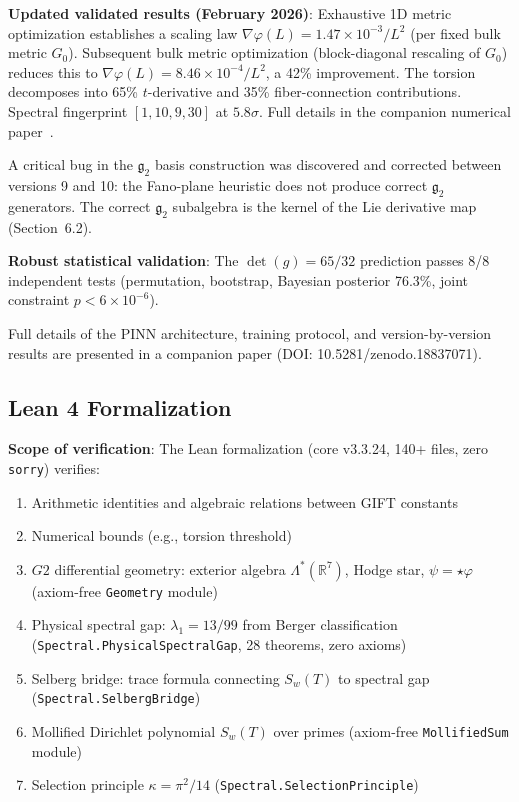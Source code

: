 \documentclass[11pt,a4paper]{article}
\newcommand{\Gtwo}{\mathrm{G}_2}
\def\Gtwo{G2}%
\begin{document}
\textbf{Updated validated results (February 2026)}: Exhaustive 1D metric optimization establishes a scaling law $\nabla\varphi(L) = 1.47 \times 10^{-3}/L^2$ (per fixed bulk metric $G_0$). Subsequent bulk metric optimization (block-diagonal rescaling of $G_0$) reduces this to $\nabla\varphi(L) = 8.46 \times 10^{-4}/L^2$, a 42\% improvement. The torsion decomposes into 65\% $t$-derivative and 35\% fiber-connection contributions. Spectral fingerprint $[1, 10, 9, 30]$ at $5.8\sigma$. Full details in the companion numerical paper~\cite{numerical2026}.

A critical bug in the $\mathfrak{g}_2$ basis construction was discovered and corrected between versions 9 and 10: the Fano-plane heuristic does not produce correct $\mathfrak{g}_2$ generators. The correct $\mathfrak{g}_2$ subalgebra is the kernel of the Lie derivative map (Section~6.2).

\textbf{Robust statistical validation}: The $\det(g) = 65/32$ prediction passes 8/8 independent tests (permutation, bootstrap, Bayesian posterior 76.3\%, joint constraint $p < 6 \times 10^{-6}$).

Full details of the PINN architecture, training protocol, and version-by-version results are presented in a companion paper (DOI: 10.5281/zenodo.18837071).

\subsection{Lean 4 Formalization}

\textbf{Scope of verification}: The Lean formalization (core v3.3.24, 140+ files, zero \texttt{sorry}) verifies:
\begin{enumerate}
\item Arithmetic identities and algebraic relations between GIFT constants
\item Numerical bounds (e.g., torsion threshold)
\item $\Gtwo$ differential geometry: exterior algebra $\Lambda^*(\mathbb{R}^7)$, Hodge star, $\psi = \star\varphi$ (axiom-free \texttt{Geometry} module)
\item Physical spectral gap: $\lambda_1 = 13/99$ from Berger classification (\texttt{Spectral.PhysicalSpectralGap}, 28 theorems, zero axioms)
\item Selberg bridge: trace formula connecting $S_w(T)$ to spectral gap (\texttt{Spectral.SelbergBridge})
\item Mollified Dirichlet polynomial $S_w(T)$ over primes (axiom-free \texttt{MollifiedSum} module)
\item Selection principle $\kappa = \pi^2/14$ (\texttt{Spectral.SelectionPrinciple})
\end{enumerate}
\end{document}
